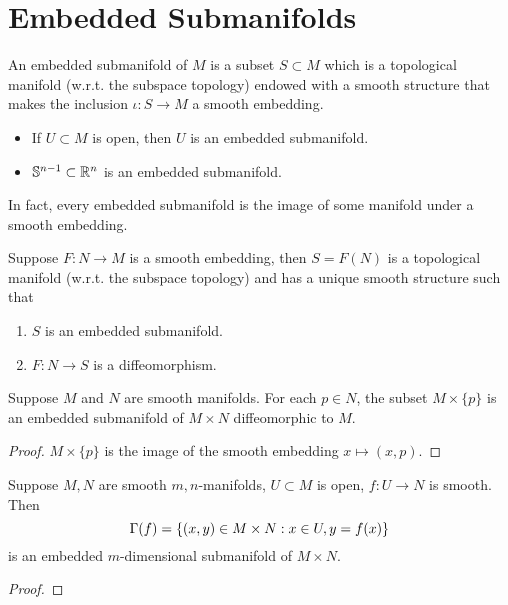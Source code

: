 \section{Embedded Submanifolds}
An embedded submanifold of $M$ is a subset $S \subset M$ which is a topological manifold (w.r.t. the subspace topology) endowed with a smooth structure that makes the inclusion $\iota:S \to M$ a smooth embedding. 
\begin{example}
    \begin{itemize}
        \item If $U \subset M$ is open, then $U$ is an embedded submanifold.
        \item $\mathbb{S}^{n-1} \subset \mathbb{R}^n$ is an embedded submanifold. 
    \end{itemize}
\end{example}

In fact, every embedded submanifold is the image of some manifold under a smooth embedding. 

\begin{proposition}
    Suppose $F:N \to M$ is a smooth embedding, then $S=F(N)$ is a topological manifold (w.r.t. the subspace topology) and has a unique smooth structure such that 
    \begin{enumerate}
    \item $S$ is an embedded submanifold. 
    \item $F:N \to S$ is a diffeomorphism. 
    \end{enumerate}
\end{proposition}    

\begin{example}
    Suppose $M$ and $N$ are smooth manifolds. For each $p \in N$, the subset $M \times \{p\}$ is an embedded submanifold of $M \times N$ diffeomorphic to $M$. 
\end{example}
\begin{proof}
    $M \times \{p\}$ is the image of the smooth embedding $x \mapsto (x,p)$. 
\end{proof}
\begin{example} 
    Suppose $M, N$ are smooth $m, n$-manifolds, $U \subset M$ is open, $f:U \to N$ is smooth. Then 
    $$\Gamma(f) = \{(x,y) \in M \times N: x\in U, y=f(x)\}$$
    is an embedded $m$-dimensional submanifold of $M \times N$. 
\end{example}
\begin{proof}
    
\end{proof}
